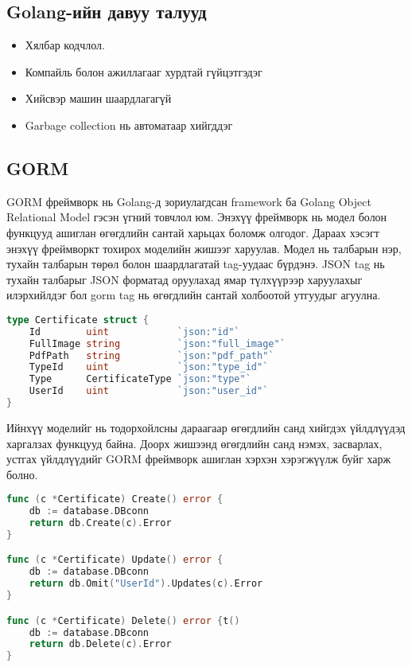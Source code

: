 \subsection{Golang-ийн давуу талууд}
\begin{itemize}
    \item Хялбар кодчлол. 
    \item Компайль болон ажиллагааг хурдтай гүйцэтгэдэг
    \item Хийсвэр машин шаардлагагүй
    \item Garbage collection нь автоматаар хийгддэг
\end{itemize}

\subsection{GORM}
GORM фреймворк нь Golang-д зориулагдсан framework ба Golang Object Relational Model гэсэн үгний товчлол юм. Энэхүү фреймворк нь модел болон функцууд ашиглан өгөгдлийн сантай харьцах боломж олгодог. Дараах хэсэгт энэхүү фреймворкт тохирох моделийн жишээг харуулав. Модел нь талбарын нэр, тухайн талбарын төрөл болон шаардлагатай tag-уудаас бүрдэнэ. JSON tag нь тухайн талбарыг JSON форматад оруулахад ямар түлхүүрээр харуулахыг илэрхийлдэг бол gorm tag нь өгөгдлийн сантай холбоотой утгуудыг агуулна. 

\begin{lstlisting}[language=Go, caption=GORM framework-ийн model жишээ, frame=single]
type Certificate struct {
	Id        uint            `json:"id"`
	FullImage string          `json:"full_image"`
	PdfPath   string          `json:"pdf_path"`
	TypeId    uint            `json:"type_id"`
	Type      CertificateType `json:"type"`
	UserId    uint            `json:"user_id"`
}
\end{lstlisting}

Ийнхүү моделийг нь тодорхойлсны дараагаар өгөгдлийн санд хийгдэх үйлдлүүдэд харгалзах функцууд байна. Доорх жишээнд өгөгдлийн санд нэмэх, засварлах, устгах үйлдлүүдийг GORM фреймворк ашиглан хэрхэн хэрэгжүүлж буйг харж болно. 

\begin{lstlisting}[language=Go, caption=Функц ашиглан өгөгдлийн сангийн үйлдлүүд хийх жишээ, frame=single]
func (c *Certificate) Create() error {
	db := database.DBconn
	return db.Create(c).Error
}

func (c *Certificate) Update() error {
	db := database.DBconn
	return db.Omit("UserId").Updates(c).Error
}

func (c *Certificate) Delete() error {t()
	db := database.DBconn
	return db.Delete(c).Error
}

\end{lstlisting}


